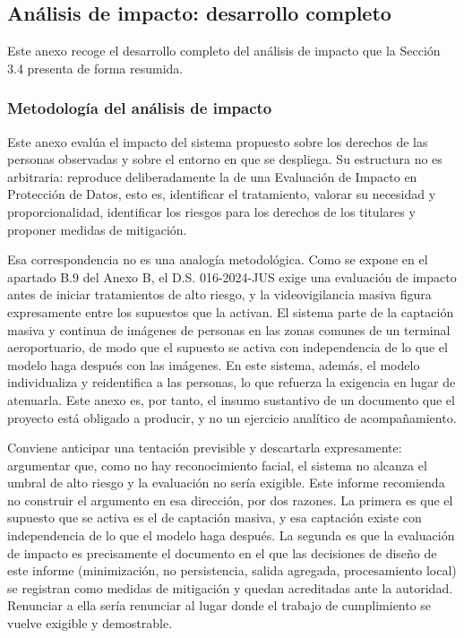 \clearpage

\subsection{Análisis de impacto: desarrollo completo}
\label{anx:impacto}

Este anexo recoge el desarrollo completo del análisis de impacto que la
Sección 3.4 presenta de forma resumida.

\subsubsection{Metodología del análisis de impacto}

Este anexo evalúa el impacto del sistema propuesto sobre los derechos de
las personas observadas y sobre el entorno en que se despliega. Su
estructura no es arbitraria: reproduce deliberadamente la de una
Evaluación de Impacto en Protección de Datos, esto es, identificar el
tratamiento, valorar su necesidad y proporcionalidad, identificar los
riesgos para los derechos de los titulares y proponer medidas de
mitigación.

Esa correspondencia no es una analogía metodológica. Como se expone en
el apartado B.9 del Anexo B, el D.S. 016-2024-JUS exige una evaluación
de impacto antes de iniciar tratamientos de alto riesgo, y la
videovigilancia masiva figura expresamente entre los supuestos que la
activan. El sistema parte de la captación masiva y continua de imágenes
de personas en las zonas comunes de un terminal aeroportuario, de modo
que el supuesto se activa con independencia de lo que el modelo haga después
con las imágenes. En este sistema, además, el modelo individualiza y
reidentifica a las personas, lo que refuerza la exigencia en lugar de
atenuarla. Este anexo es, por tanto, el
insumo sustantivo de un documento que el proyecto está obligado a
producir, y no un ejercicio analítico de acompañamiento.

Conviene anticipar una tentación previsible y descartarla expresamente:
argumentar que, como no hay reconocimiento facial, el sistema no alcanza
el umbral de alto riesgo y la evaluación no sería exigible. Este informe recomienda no construir el argumento en
esa dirección, por dos razones. La primera es que el supuesto que se
activa es el de captación masiva, y esa captación existe con
independencia de lo que el modelo haga después. La segunda es que la
evaluación de impacto es precisamente el documento en el que las
decisiones de diseño de este informe (minimización, no persistencia,
salida agregada, procesamiento local) se registran como medidas de
mitigación y quedan acreditadas ante la autoridad. Renunciar a ella
sería renunciar al lugar donde el trabajo de cumplimiento se vuelve
exigible y demostrable.

